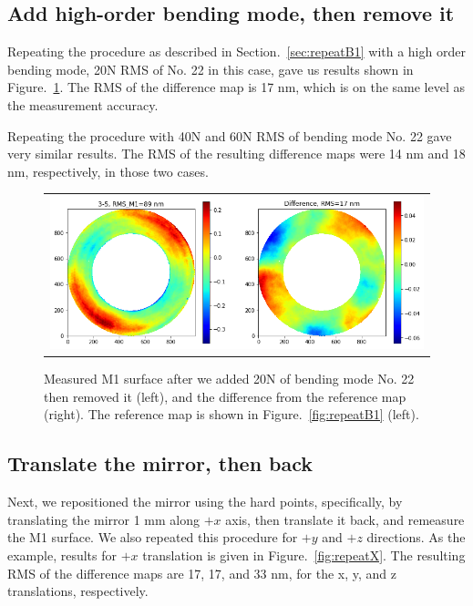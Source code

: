 \documentclass [twoside,openbib,12pt]{article}
\begin{document}
\subsection{Add high-order bending mode, then remove it}

Repeating the procedure as described in Section.~\ref{sec:repeatB1}
with a high order bending mode, 20N RMS of No. 22 in this case, gave
us results shown in Figure.~\ref{fig:repeatB22}. 
The RMS of the difference map is 17
nm, which is on the same level as the measurement accuracy.

Repeating the procedure with 40N and 60N RMS of bending mode No. 22
gave very similar results. The RMS of the resulting difference maps
were 14 nm and 18 nm, respectively, in those two cases.

 \begin{figure}[bthp]
   \begin{center}
   \begin{tabular}{c}
\includegraphics[width=120mm]{figures/repeatB22.png}
  \end{tabular}
   \end{center}
   \caption
  { \label{fig:repeatB22}
Measured M1 surface after we added 20N of bending mode No. 22 then
removed it (left), and the difference from the reference map
(right). The reference map is shown in Figure.~\ref{fig:repeatB1} (left).
 }
\end{figure}

\subsection{Translate the mirror, then back}

Next, we repositioned the mirror using the hard points, specifically,
by translating the mirror 1 mm along $+x$ axis, then translate it
back, and remeasure the M1 surface. We also repeated this procedure
for $+y$ and $+z$ directions. As the example, results for $+x$
translation is given in Figure.~\ref{fig:repeatX}.
The resulting RMS of the difference maps are 17, 17, and 33
nm, for the x, y, and z translations, respectively.
\end{document}
